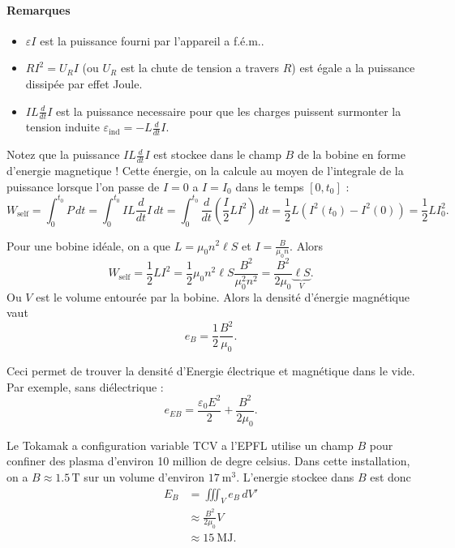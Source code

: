 \paragraph{Remarques}
\begin{itemize}
\item $\varepsilon I$ est la puissance fourni par l'appareil a f.é.m..
\item $RI^{2}=U_{R}I$ (ou $U_{R}$ est la chute de tension a travers $R$) est égale a la puissance dissipée par effet Joule.
\item $IL\frac{d}{dt}I$ est la puissance necessaire pour que les charges puissent surmonter la tension induite $\varepsilon _{\mathrm{ind}}=-L\frac{d}{dt}I$.
\end{itemize}

Notez que la puissance $IL\frac{d}{dt}I$ est stockee dans le champ $B$ de la bobine en forme d'energie magnetique ! Cette énergie, on la calcule au moyen de l'integrale de la puissance lorsque l'on passe de $I=0$ a $I=I_{0}$ dans le temps $[0,t_{0}]$ :
$$
W_{\mathrm{self}}=\int_{0}^{t_{0}} P \, dt=\int_{0}^{t_{0}} IL\frac{d}{dt} I \, dt=\int_{0}^{t_{0}} \frac{d}{dt} \left( \frac{I}{2}LI^{2} \right) \, dt=\frac{1}{2}L(I^{2}(t_{0})-I^{2}(0))=\frac{1}{2}LI_{0}^{2}.
$$
\begin{example}
Pour une bobine idéale, on a que $L=\mu_{0}n^{2}\ell S$ et $I=\frac{B}{\mu_{0}n}$. Alors
$$
W_{\mathrm{self}}=\frac{1}{2}LI^{2}=\frac{1}{2}\mu_{0}n^{2}\ell S \frac{B^{2}}{\mu^{2}_{0}n^{2}}=\frac{B^{2}}{2\mu_0}\underbrace{ \ell S }_{ V }.
$$
Ou $V$ est le volume entourée par la bobine. Alors la densité d'énergie magnétique vaut 
$$
e_{B}=\frac{1}{2} \frac{B^{2}}{\mu_{0}}.
$$

Ceci permet de trouver la densité d'Energie électrique et magnétique dans le vide. Par exemple, sans diélectrique :
$$
e_{EB}=\frac{\varepsilon_{0}E^{2}}{2}+\frac{B^{2}}{2\mu_{0}}.
$$\end{example}
\begin{example}[Tokomak]
Le Tokamak a configuration variable TCV a l'EPFL utilise un champ $B$ pour confiner des plasma d'environ 10 million de degre celsius. Dans cette installation, on a $B\approx 1.5\,\mathrm{T}$ sur un volume d'environ $17~\mathrm{m}^{3}$. L'energie stockee dans $B$ est donc
\begin{align*}
E_{B} & =\iiint _{V}e_{B}\,dV' \\
 & \approx \frac{B^{2}}{2\mu_{0}}V  \\
 & \approx 15~\mathrm{MJ}.
\end{align*}
\end{example}